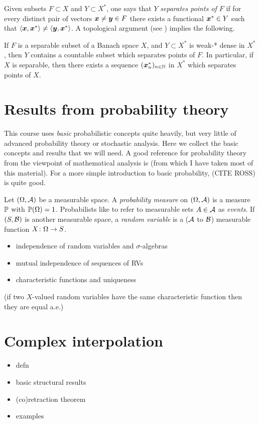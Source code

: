 Given subsets $F \subset X$ and $Y \subset X^{*}$, one says that $Y$ \emph{separates points of $F$} if for every distinct pair of vectors $\mb{x} \neq \mb{y} \in F$ there exists a functional $\mb{x}^{*} \in Y$ such that $\langle \mb{x}, \mb{x}^{*} \rangle \neq \langle \mb{y}, \mb{x}^{*} \rangle$.
A topological argument (see \cite[Proposition B.1.11]{HNVW16}) implies the following.

\begin{prop}\label{prop:sep-sep-points}
  If $F$ is a separable subset of a Banach space $X$, and $Y \subset X^{*}$ is weak-* dense in $X^{*}$, then $Y$ contains a countable subset which separates points of $F$.
  In particular, if $X$ is separable, then there exists a sequence $(\mb{x}_{n}^{*})_{n \in \N}$ in $X^{*}$ which separates points of $X$.
\end{prop}

\section{Results from probability theory}\label{sec:probability}

This course uses \emph{basic} probabilistic concepts quite heavily, but very little of advanced probability theory or stochastic analysis.
Here we collect the basic concepts and results that we will need.
A good reference for probability theory from the viewpoint of mathematical analysis is \cite{rD04} (from which I have taken most of this material).
For a more simple introduction to basic probability, (CITE ROSS) is quite good.

Let $(\Omega,\mc{A})$ be a measurable space.
A \emph{probability measure} on $(\Omega,\mc{A})$ is a measure $\P$ with $\P(\Omega) = 1$.
Probabilists like to refer to measurable sets $A \in \mc{A}$ as \emph{events}.
If $(S,\mc{B})$ is another measurable space, a \emph{random variable} is a ($\mc{A}$ to $\mc{B}$) measurable function $\map{X}{\Omega}{S}$.


\begin{itemize}
\item independence of random variables and $\sigma$-algebras
\item mutual independence of sequences of RVs
\item characteristic functions and uniqueness
\end{itemize}

\begin{thm}\label{thm:characteristic-function-uniqueness}
  (if two $X$-valued random variables have the same characteristic function then they are equal a.e.)
\end{thm}

\section{Complex interpolation}

\begin{itemize}
\item defn
\item basic structural results
\item (co)retraction theorem
\item examples 
\end{itemize}


